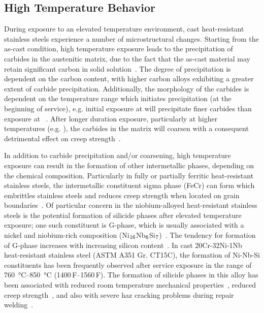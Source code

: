\subsection{High Temperature Behavior}
During exposure to an elevated temperature environment, cast heat-resistant stainless steels experience a number of microstructural changes. Starting from the as-cast condition, high temperature exposure leads to the precipitation of carbides in the austenitic matrix, due to the fact that the as-cast material may retain significant carbon in solid solution~\cite{avery_cast_1969}. The degree of precipitation is dependent on the carbon content, with higher carbon alloys exhibiting a greater extent of carbide precipitation. Additionally, the morphology of the carbides is dependent on the temperature range which initiates precipitation (at the beginning of service), e.g. initial exposure at  will precipitate finer carbides than exposure at ~\cite{avery_cast_1969}. After longer duration exposure, particularly at higher temperatures (e.g. ), the carbides in the matrix will coarsen with a consequent detrimental effect on creep strength~\cite{avery_cast_1969}.


In addition to carbide precipitation and/or coarsening, high temperature exposure can result in the formation of other intermetallic phases, depending on the chemical composition.  Particularly in fully or partially ferritic heat-resistant stainless steels, the intermetallic constituent sigma phase (FeCr) can form which embrittles stainless steels and reduces creep strength when located on grain boundaries~\cite{sourmail_precipitation_2001,avery_cast_1969}. Of particular concern in the niobium-alloyed heat-resistant stainless steels is the potential formation of silicide phases after elevated temperature exposure; one such constituent is G-phase, which is usually associated with a nickel and niobium-rich composition (Ni$_\textnormal{16}$Nb$_\textnormal{6}$Si$_\textnormal{7}$)~\cite{sourmail_precipitation_2001}. The tendency for formation of G-phase increases with increasing silicon content~\cite{ecob_formation_1987,pedro_ibanez_effects_1993}. In cast 20Cr-32Ni-1Nb heat-resistant stainless steel (ASTM A351 Gr. CT15C), the formation of Ni-Nb-Si constituents has been frequently observed after service exposure in the range of \SIrange[range-phrase=--]{760}{850}{\degreeCelsius} (1400\,\textdegree{}F--1560\,\textdegree{}F). The formation of silicide phases in this alloy has been associated with reduced room temperature mechanical properties~\cite{hoffman_high_2000-1,shibasaki_experience_1994}, reduced creep strength~\cite{shibasaki_experience_1994}, and also with severe \gls{haz} cracking problems during repair welding~\cite{hoffman_weld_1998,knowles_service_2004}.

